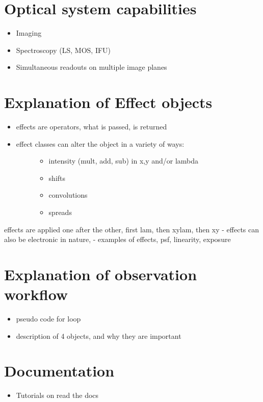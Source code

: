 

\section{Optical system capabilities%
  \label{optical-system-capabilities}%
}

\begin{itemize}
\item Imaging

\item Spectroscopy (LS, MOS, IFU)

\item Simultaneous readouts on multiple image planes
\end{itemize}


\section{Explanation of Effect objects%
  \label{explanation-of-effect-objects}%
}

\begin{itemize}
\item effects are operators, what is passed, is returned

\item 
\begin{description}
\item[{effect classes can alter the object in a variety of ways:}] \leavevmode 
\begin{itemize}
\item intensity (mult, add, sub) in x,y and/or lambda

\item shifts

\item convolutions

\item spreads
\end{itemize}

\end{description}
\end{itemize}

effects are applied one after the other, first lam, then xylam, then xy
- effects can also be electronic in nature,
- examples of effects, psf, linearity, exposure


\section{Explanation of observation workflow%
  \label{explanation-of-observation-workflow}%
}

\begin{itemize}
\item pseudo code for loop

\item description of 4 objects, and why they are important
\end{itemize}


\section{Documentation%
  \label{documentation}%
}

\begin{itemize}
\item Tutorials on read the docs
\end{itemize}
